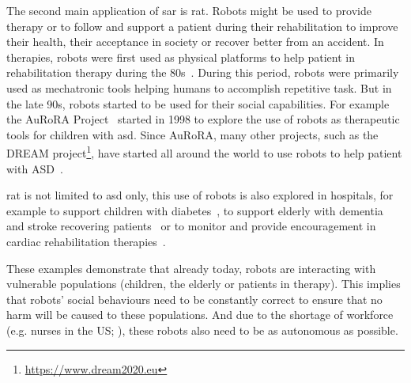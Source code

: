		
	The second main application of \gls{sar} is \gls{rat}. Robots might be used to provide therapy or to follow and support a patient during their rehabilitation to improve their health, their acceptance in society or recover better from an accident. In therapies, robots were first used as physical platforms to help patient in rehabilitation therapy during the 80s~\citep{harwin1988robot}. During this period, robots were primarily used as mechatronic tools helping humans to accomplish repetitive task. But in the late 90s, robots started to be used for their social capabilities. For example the AuRoRA Project~\citep{dautenhahn1999robots} started in 1998 to explore the use of robots as therapeutic tools for children with \gls{asd}. Since AuRoRA, many other projects, such as the DREAM project\footnote{\url{https://www.dream2020.eu}}, have started all around the world to use robots to help patient with ASD~\citep{diehl2012clinical,esteban2017build}. 
	
	\gls{rat} is not limited to \gls{asd} only, this use of robots is also explored in hospitals, for example to support children with diabetes~\citep{belpaeme2012multimodal}, to support elderly with dementia~\citep{wada2005psychological} and stroke recovering patients~\citep{mataric2007socially} or to monitor and provide encouragement in cardiac rehabilitation therapies~\citep{lara2017human}.	
	
	These examples demonstrate that already today, robots are interacting with vulnerable populations (children, the elderly or patients in therapy). This implies that robots' social behaviours need to be constantly correct to ensure that no harm will be caused to these populations. And due to the shortage of workforce (e.g. nurses in the US; \citealt{nevidjon2001nursing}), these robots also need to be as autonomous as possible.
	
